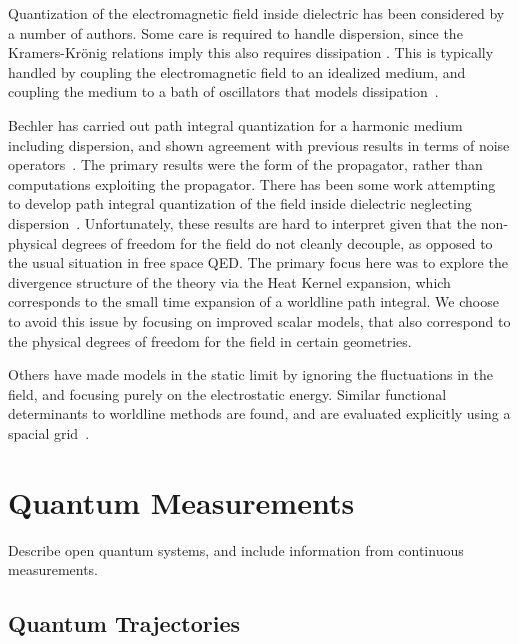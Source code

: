 Quantization of the electromagnetic field inside dielectric has been considered by a number of authors.  Some care is required to handle dispersion, since the Kramers-Kr\"onig relations imply this also requires dissipation .  This is typically handled by coupling the electromagnetic field to an idealized medium, and coupling the medium to a bath of oscillators that models dissipation~\cite{Huttner1992,Dung1998}.  

Bechler has carried out path integral quantization for a harmonic medium including dispersion, and shown agreement with previous results in terms of noise operators~\cite{Bechler1999}.  The primary results were the form of the propagator, rather than computations exploiting the propagator.  There has been some work attempting to develop path integral quantization of the field inside dielectric neglecting dispersion~\cite{Bordag1998}.  Unfortunately, these results are hard to interpret given that the non-physical degrees of freedom for the field do not cleanly decouple, as opposed to the usual situation in free space QED.  The primary focus here was to explore the divergence structure of the theory via the Heat Kernel expansion, which corresponds to the small time expansion of a worldline path integral.  We choose to avoid this issue by focusing on improved scalar models, that also correspond to the physical degrees of freedom for the field in certain geometries.  

Others have made models in the static limit by ignoring the fluctuations in the field, and focusing purely on the electrostatic energy.  Similar functional determinants to worldline methods are found, and are evaluated explicitly using a spacial grid~\cite{Pasquali2008}.  


\section{Quantum Measurements}

Describe open quantum systems, and include information from continuous measurements. 

\subsection{Quantum Trajectories}

